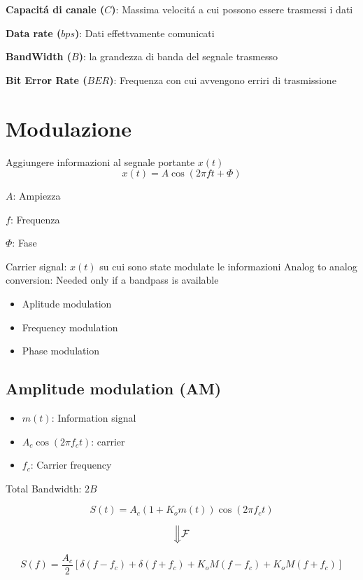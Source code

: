 \documentclass{article}
\begin{document}
\textbf{Capacit\'a di canale ($C$)}: Massima velocit\'a a cui possono essere trasmessi i dati

\textbf{Data rate ($bps$)}: Dati effettvamente comunicati

\textbf{BandWidth ($B$)}: la grandezza di banda del segnale trasmesso

\textbf{Bit Error Rate ($BER$)}: Frequenza con cui avvengono erriri di trasmissione

\section{Modulazione}
Aggiungere informazioni al segnale portante $x(t)$
\[
    x(t) = A\cos(2\pi ft + \Phi)
\]

$A$: Ampiezza

$f$: Frequenza

$\Phi$: Fase

Carrier signal: $x(t)$ su cui sono state modulate le informazioni
Analog to analog conversion: Needed only if a bandpass is available

\begin{samepage}
    \begin{itemize}
        \item Aplitude modulation
        \item Frequency modulation
        \item Phase modulation
    \end{itemize}
\end{samepage}

\subsection{Amplitude modulation (AM)}
\begin{itemize}
    \item $m(t)$: Information signal
    \item $A_c\cos(2 \pi f_c t)$: carrier
    \item $f_c$: Carrier frequency
\end{itemize}

Total Bandwidth: $2B$

\[S(t) = A_c(1 + K_o m(t)) \cos(2\pi f_c t)\]

\[\quad \Big\Downarrow \mathcal{F} \quad \]

\[S(f) = \frac{A_c}{2} \left[ \delta(f - f_c) + \delta(f+f_c) + K_o M(f - f_c) + K_o M(f+f_c)\right]\]

\end{document}
